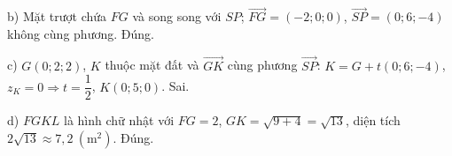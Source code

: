 \begin{ex}
{b) Mặt trượt chứa $FG$ và song song với $SP$; $\overrightarrow{FG}=(-2;0;0)$, $\overrightarrow{SP}=(0;6;-4)$ không cùng phương. Đúng.

c) $G(0;2;2)$, $K$ thuộc mặt đất và $\overrightarrow{GK}$ cùng phương $\overrightarrow{SP}$: $K=G+t(0;6;-4)$, $z_K=0\Rightarrow t=\dfrac12$, $K(0;5;0)$. Sai.

d) $FGKL$ là hình chữ nhật với $FG=2$, $GK=\sqrt{9+4}=\sqrt{13}$, diện tích $2\sqrt{13}\approx7{,}2\ (\text{m}^2)$. Đúng.}
\end{ex}
